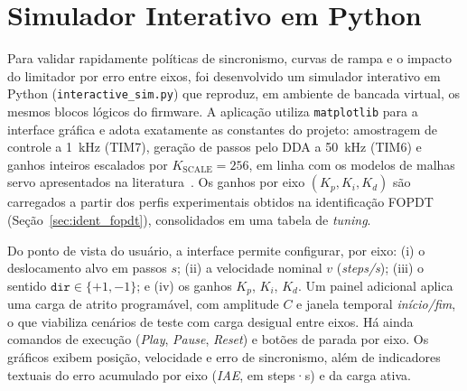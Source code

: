 \section{Simulador Interativo em Python}
\label{subsec:simulador-interativo}

Para validar rapidamente pol\'iticas de sincronismo, curvas de rampa e o
impacto do limitador por erro entre eixos, foi desenvolvido um simulador
interativo em Python (\texttt{interactive\_sim.py}) que reproduz, em ambiente
de bancada virtual, os mesmos blocos l\'ogicos do firmware. A aplica\c{c}\~ao
utiliza \texttt{matplotlib} para a interface gr\'afica e adota exatamente as
constantes do projeto: amostragem de controle a \SI{1}{kHz} (TIM7),
gera\c{c}\~ao de passos pelo DDA a \SI{50}{kHz} (TIM6) e ganhos inteiros
escalados por $K_\text{SCALE}=256$, em linha com os modelos de malhas servo
apresentados na literatura~\cite{astrom1995,kenjo1994,efficient_reference}.
Os ganhos por eixo $(K_p, K_i, K_d)$ s\~ao carregados a partir dos perfis
experimentais obtidos na identifica\c{c}\~ao FOPDT
(Se\c{c}\~ao~\ref{sec:ident_fopdt}), consolidados em uma tabela de
\emph{tuning}.

Do ponto de vista do usu\'ario, a interface permite configurar, por eixo:
(i) o deslocamento alvo em passos $s$; (ii) a velocidade nominal $v$
(\emph{steps/s}); (iii) o sentido $\texttt{dir}\in\{+1,-1\}$; e (iv) os
ganhos $K_p$, $K_i$, $K_d$. Um painel adicional aplica uma carga de atrito
program\'avel, com amplitude $C$ e janela temporal \emph{in\'icio/fim}, o que
viabiliza cen\'arios de teste com carga desigual entre eixos. H\'a ainda
comandos de execu\c{c}\~ao (\emph{Play}, \emph{Pause}, \emph{Reset}) e bot\~oes
de parada por eixo. Os gr\'aficos exibem posi\c{c}\~ao, velocidade e erro de
sincronismo, al\'em de indicadores textuais do erro acumulado por eixo
(\emph{IAE}, em steps·s) e da carga ativa.

